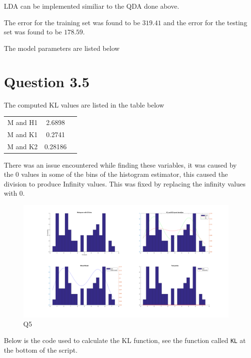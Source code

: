 LDA can be implemented similiar to the QDA done above.



The error for the training set was found to be $319.41$ and 
the error for the testing set was found to be $178.59$.

The model parameters are listed below



\section*{Question 3.5}

The computed KL values are listed in the table below
\begin{center}
    \begin{tabular}{|c|c|c|}
        \hline
        M and H1 & 2.6898 \\
        M and K1 & 0.2741  \\
        M and K2 & 0.28186 \\
        \hline
    \end{tabular}
\end{center}

There was an issue encountered while finding these variables, it was caused by the 0 values in some of the bins of the histogram estimator, this caused the division to produce Infinity values. This was fixed by replacing the infinity values with 0.

\begin{figure}[H]
    \includegraphics[width=\linewidth]{../../pracs/week4/images/q5}
    \centering
    \caption{Q5}
\end{figure}

Below is the code used to calculate the KL function, see the function called \texttt{KL} at the bottom of the script.




